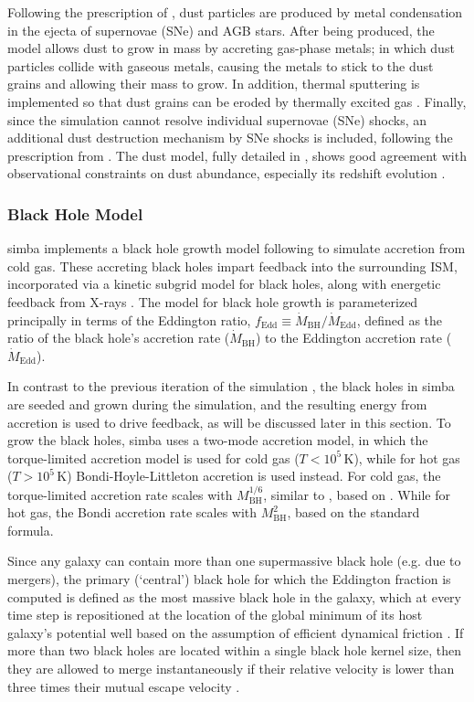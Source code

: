 \documentclass[twocolumn, linenumbers]{aastex631}
\newcommand{\mbh}{M_{\text{BH}}}
\newcommand{\mbhd}{\dot{M}_{\text{BH}}}
\newcommand{\fedd}{f_{\text{Edd}}}
\newcommand{\simba}[0]{{\sc simba} }
\begin{document}
Following the prescription of \cite{dwek}, dust particles are produced by metal condensation in the ejecta of supernovae (SNe) and AGB stars.  After being produced, the model allows dust to grow in mass by accreting gas-phase metals; in which dust particles collide with gaseous metals, causing the metals to stick to the dust grains and allowing their mass to grow.  In addition, thermal sputtering is implemented so that dust grains can be eroded by thermally excited gas  \citep{simba}.  Finally, since the simulation cannot resolve individual supernovae (SNe) shocks, an additional dust destruction mechanism by SNe shocks is included, following the prescription from \cite{mckinnon}.  The dust model, fully detailed in \cite{Li2019}, shows good agreement with observational constraints on dust abundance, especially its redshift evolution \citep{parente2025}.

\subsubsection{Black Hole Model}
\label{ssec:bh}
\simba implements a black hole growth model following \cite{bhtorque} to simulate accretion from cold gas.  These accreting black holes impart feedback into the surrounding ISM, incorporated via a kinetic subgrid model for black holes, along with energetic feedback from X-rays \citep{simba}.  The model for black hole growth is parameterized principally in terms of the Eddington ratio, $\fedd\equiv \mbhd/\dot{M}_{\text{Edd}}$, defined as the ratio of the black hole's accretion rate ($\mbhd$) to the Eddington accretion rate ($\dot{M}_{\text{Edd}}$).  

In contrast to the previous iteration of the simulation \citep{mufasa}, the black holes in \simba are seeded and grown during the simulation, and the resulting energy from accretion is used to drive feedback, as will be discussed later in this section.  To grow the black holes, \simba uses a two-mode accretion model, in which the torque-limited accretion model is used for cold gas ($T<10^5\,\text{K}$), while for hot gas ($T>10^5\,\text{K}$) Bondi-Hoyle-Littleton accretion is used instead.  For cold gas, the torque-limited accretion rate scales with $\mbh^{1/6}$, similar to \cite{Angles2017}, based on \citet{Hopkins2011}.  While for hot gas, the Bondi accretion rate scales with $\mbh^2$, based on the standard \cite{Bondi1952} formula.


Since any galaxy can contain more than one supermassive black hole (e.g. due to mergers), the primary (`central') black hole for which the Eddington fraction is computed is defined as the most massive black hole in the galaxy, which at every time step is repositioned at the location of the global minimum of its host galaxy's potential well based on the assumption of efficient dynamical friction \citep{simba}.  If more than two black holes are located within a single black hole kernel size, then they are allowed to merge instantaneously if their relative velocity is lower than three times their mutual escape velocity \citep{simba}.  
\end{document}
